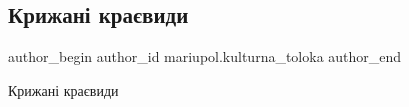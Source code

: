  
 
 
 
 

\subsection{Крижані краєвиди}
\label{sec:01_02_2019.fb.mariupol.kulturna_toloka.1.kryzhani_krajevydy}

\ifcmt
 author_begin
   author_id mariupol.kulturna_toloka
 author_end
\fi

Крижані краєвиди
